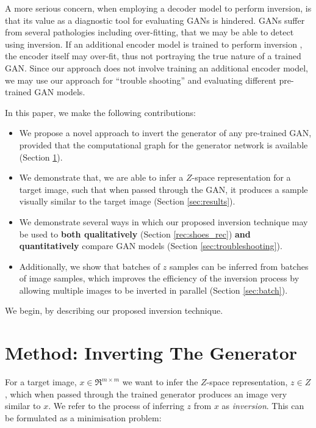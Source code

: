 \documentclass[journal]{IEEEtran}
\begin{document}
A more serious concern, when employing a decoder model to perform inversion, is that its value as a diagnostic tool for evaluating GANs is hindered. GANs suffer from several pathologies including over-fitting, that we may be able to detect using inversion. If an additional encoder model is trained to perform inversion \cite{li2017alice, donahue2016adversarial, dumoulin2016adversarially,luo2017learning}, the encoder itself may over-fit, thus not portraying the true nature of a trained GAN. Since our approach does not involve training an additional encoder model, we may use our approach for ``trouble shooting'' and evaluating different pre-trained GAN models. 






In this paper, we make the following contributions:
\begin{itemize}
    \item We propose a novel approach to invert the generator of any pre-trained GAN, provided that the computational graph for the generator network is available (Section \ref{sec:method}).
    \item We demonstrate that, we are able to infer a $Z$-space representation for a target image, such that when passed through the GAN, it produces a sample visually similar to the target image (Section \ref{sec:results}).
    \item We demonstrate several ways in which our proposed inversion technique may be used to \textbf{both qualitatively}  (Section \ref{rec:shoes_rec})  \textbf{and quantitatively} compare GAN models (Section \ref{sec:troubleshooting}).
    \item Additionally, we show that batches of $z$ samples can be inferred from batches of image samples, which improves the efficiency of the inversion process by allowing multiple images to be inverted in parallel (Section \ref{sec:batch}).
\end{itemize}  


We begin, by describing our proposed inversion technique.





\section{Method: Inverting The Generator}
\label{sec:method}

For a target image, $x \in \Re^{m \times m}$ we want to infer the $Z$-space representation, $z \in Z$, which when passed through the trained generator produces an image very similar to $x$. We refer to the process of inferring $z$ from $x$ as \textit{inversion}. This can be formulated as a minimisation problem:
\end{document}
